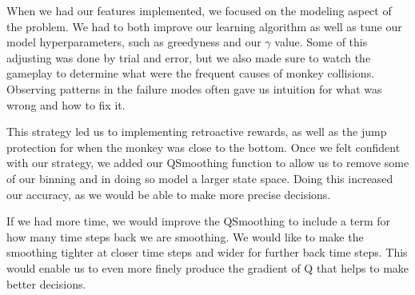 \documentclass[11pt]{article}
\begin{document}
When we had our features implemented, we focused on the modeling aspect of the problem. We had to both improve our learning algorithm as well as tune our model hyperparameters, such as greedyness and our $\gamma$ value. Some of this adjusting was done by trial and error, but we also made sure to watch the gameplay to determine what were the frequent causes of monkey collisions. Observing patterns in the failure modes often gave us intuition for what was wrong and how to fix it.

This strategy led us to implementing retroactive rewards, as well as the jump protection for when the monkey was close to the bottom. Once we felt confident with our strategy, we added our QSmoothing function to allow us to remove some of our binning and in doing so model a larger state space. Doing this increased our accuracy, as we would be able to make more precise decisions.  

If we had more time, we would improve the QSmoothing to include a term for how many time steps back we are smoothing.  We would like to make the smoothing tighter at closer time steps and wider for further back time steps.  This would enable us to even more finely produce the gradient of Q that helps to make better decisions.
\end{document}
